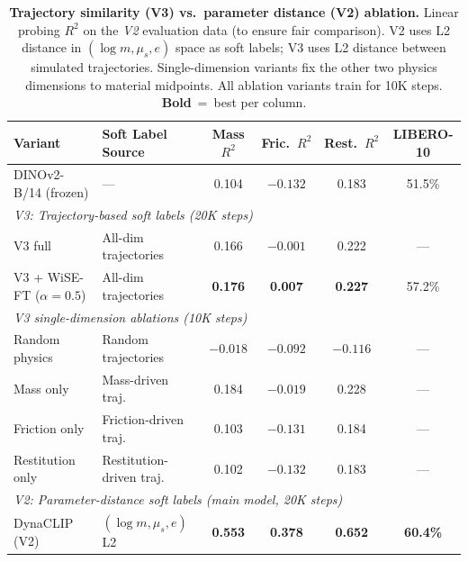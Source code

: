 \documentclass{article}
\newcommand{\methodname}{DynaCLIP}
\newcommand{\best}[1]{\textbf{#1}}
\begin{document}
\begin{table}[t]
\centering
\caption{\textbf{Trajectory similarity (V3) vs.\ parameter distance (V2) ablation.} Linear probing $R^2$ on the \emph{V2} evaluation data (to ensure fair comparison). V2 uses L2 distance in $(\log m, \mu_s, e)$ space as soft labels; V3 uses L2 distance between simulated trajectories. Single-dimension variants fix the other two physics dimensions to material midpoints. All ablation variants train for 10K steps. \best{Bold}~=~best per column.}
\label{tab:v3_ablation}
\small
\begin{tabular}{@{}llcccc@{}}
\toprule
\textbf{Variant} & \textbf{Soft Label Source} & \textbf{Mass $R^2$} & \textbf{Fric.\ $R^2$} & \textbf{Rest.\ $R^2$} & \textbf{LIBERO-10} \\
\midrule
DINOv2-B/14 (frozen) & --- & 0.104 & $-0.132$ & 0.183 & 51.5\% \\
\midrule
\multicolumn{6}{l}{\emph{V3: Trajectory-based soft labels (20K steps)}} \\
\quad V3 full & All-dim trajectories & 0.166 & $-0.001$ & 0.222 & --- \\
\quad V3 + WiSE-FT ($\alpha{=}0.5$) & All-dim trajectories & \best{0.176} & \best{0.007} & \best{0.227} & 57.2\% \\
\midrule
\multicolumn{6}{l}{\emph{V3 single-dimension ablations (10K steps)}} \\
\quad Random physics & Random trajectories & $-0.018$ & $-0.092$ & $-0.116$ & --- \\
\quad Mass only & Mass-driven traj. & 0.184 & $-0.019$ & 0.228 & --- \\
\quad Friction only & Friction-driven traj. & 0.103 & $-0.131$ & 0.184 & --- \\
\quad Restitution only & Restitution-driven traj. & 0.102 & $-0.132$ & 0.183 & --- \\
\midrule
\multicolumn{6}{l}{\emph{V2: Parameter-distance soft labels (main model, 20K steps)}} \\
\quad \methodname{} (V2) & $(\log m, \mu_s, e)$ L2 & \best{0.553} & \best{0.378} & \best{0.652} & \best{60.4\%} \\
\bottomrule
\end{tabular}
\vspace{-0.5em}
\end{table}
\end{document}
